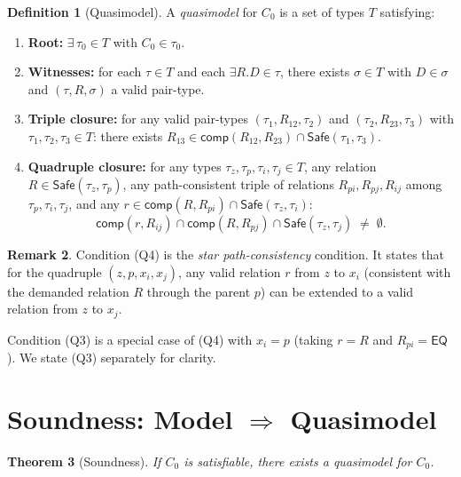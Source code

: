 \documentclass[a4paper,11pt]{article}
\newtheorem{theorem}{Theorem}[section]
\theoremstyle{definition}
\newtheorem{definition}[theorem]{Definition}
\newtheorem{remark}[theorem]{Remark}
\newcommand{\EQ}{\ensuremath{\mathsf{EQ}}}
\newcommand{\comp}{\ensuremath{\mathsf{comp}}}
\newcommand{\Safe}{\ensuremath{\mathsf{Safe}}}
\begin{document}
\begin{definition}[Quasimodel]
\label{def:quasimodel}
A \emph{quasimodel} for $C_0$ is a set of types $T$ satisfying:
\begin{enumerate}[nosep,label=(Q\arabic*)]
  \item \textbf{Root:}\; $\exists\, \tau_0 \in T$ with
    $C_0 \in \tau_0$.
  \item \textbf{Witnesses:}\; for each $\tau \in T$ and each
    $\exists R.D \in \tau$, there exists $\sigma \in T$ with
    $D \in \sigma$ and $(\tau, R, \sigma)$ a valid pair-type.
  \item \textbf{Triple closure:}\; for any valid pair-types
    $(\tau_1, R_{12}, \tau_2)$ and $(\tau_2, R_{23}, \tau_3)$
    with $\tau_1, \tau_2, \tau_3 \in T$: there exists
    $R_{13} \in \comp(R_{12}, R_{23}) \cap \Safe(\tau_1, \tau_3)$.
  \item \textbf{Quadruple closure:}\; for any types
    $\tau_z, \tau_p, \tau_i, \tau_j \in T$, any relation
    $R \in \Safe(\tau_z, \tau_p)$, any path-consistent triple
    of relations $R_{pi}, R_{pj}, R_{ij}$ among
    $\tau_p, \tau_i, \tau_j$, and any
    $r \in \comp(R, R_{pi}) \cap \Safe(\tau_z, \tau_i)$:
    \[
      \comp(r, R_{ij}) \cap
      \comp(R, R_{pj}) \cap
      \Safe(\tau_z, \tau_j) \;\neq\; \emptyset.
    \]
\end{enumerate}
\end{definition}

\begin{remark}
Condition (Q4) is the \emph{star path-consistency} condition.
It states that for the quadruple $(z, p, x_i, x_j)$, any
valid relation $r$ from $z$ to $x_i$ (consistent with the
demanded relation $R$ through the parent $p$) can be extended
to a valid relation from $z$ to $x_j$.

Condition (Q3) is a special case of (Q4) with $x_i = p$
(taking $r = R$ and $R_{pi} = \EQ$).  We state (Q3) separately
for clarity.
\end{remark}


\section{Soundness: Model $\Rightarrow$ Quasimodel}
\label{sec:soundness}

\begin{theorem}[Soundness]
\label{thm:soundness}
If $C_0$ is satisfiable, there exists a quasimodel for $C_0$.
\end{theorem}
\end{document}
